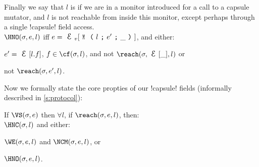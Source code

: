 \noindent Finally we say that $l$ is \HNO if we are in a monitor introduced for a call to a capsule mutator, and $l$ is not reachable from inside this monitor, except perhaps through a single \Q!capsule! field access.\\
\indent $\HNO(\s, e, l)$ iff $e = \EV[\M{l}{e'}{\_}]$, and either:
\begin{iitemize}
\item $e' = \E[l.f]$, $f \in \cf(\s, l)$, and not $\reach(\s, \E[\_], l)$ or
\item not $\reach(\s, e', l)$.
\end{iitemize}

\noindent Now we formally state the core propties of our \Q!capsule! fields (informally described in \ref{s:protocol}):%
\SS\begin{theorem}\rm
If $\VS(\s, e)$ then $\forall l$, if $\reach(\s, e, l)$, then:\\
\indent $\HNC(\s, l)$ and either:
\begin{iitemize}
\item $\WE(\s, e, l)$ and $\NCM(\s, e, l)$, or
\item $\HNO(\s, e, l)$.
\end{iitemize}
\end{theorem}\SS
